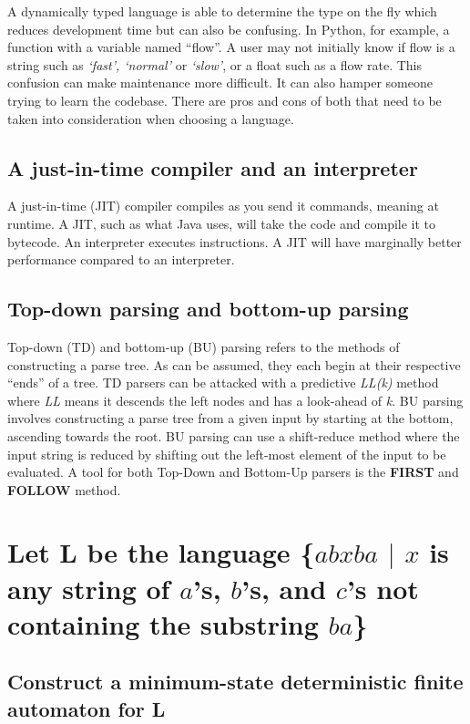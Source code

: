 \documentclass{article}
\begin{document}
A dynamically typed language is able to determine the type on the fly which reduces development time but can also be confusing. In Python, for example, a function with a variable named ``flow''. A user may not initially know if flow is a string such as \textit{`fast', `normal'} or \textit{`slow'}, or a float such as a flow rate. This confusion can make maintenance more difficult. It can also hamper someone trying to learn the codebase. There are pros and cons of both that need to be taken into consideration when choosing a language.

\subsection[JIT Compiler and Interpreters]{A just-in-time compiler and an interpreter}
A just-in-time (JIT) compiler compiles as you send it commands, meaning at runtime. A JIT, such as what Java uses, will take the code and compile it to bytecode. An interpreter executes instructions. A JIT will have marginally better performance compared to an interpreter.

\subsection[Top-Down and Bottom-Up Parsing]{Top-down parsing and bottom-up parsing}
Top-down (TD) and bottom-up (BU) parsing refers to the methods of constructing a parse tree. As can be assumed, they each begin at their respective ``ends'' of a tree. TD parsers can be attacked with a predictive \textit{LL(k)} method where \textit{LL} means it descends the left nodes and has a look-ahead of \textit{k}. BU parsing involves constructing a parse tree from a given input by starting at the bottom, ascending towards the root. BU parsing can use a shift-reduce method where the input string is reduced by shifting out the left-most element of the input to be evaluated. A tool for both Top-Down and Bottom-Up parsers is the \textbf{FIRST} and \textbf{FOLLOW} method.




\newpage
\section[Problem 2]{Let L be the language \{$abxba$ $\vert$ $x$ is any string of $a$'s, $b$'s, and $c$'s not containing the substring $ba$\}}
\subsection[Minimum-State DFA]{Construct a minimum-state deterministic finite automaton for L}
\end{document}
